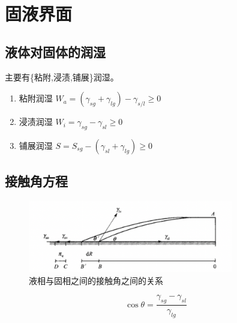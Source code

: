 \chapter{固液界面}

\section{液体对固体的润湿}

主要有\{粘附,浸渍,铺展\}润湿。

\begin{enumerate}
    \item 粘附润湿 $W_a = \left(\gamma_{sg} + \gamma_{lg}\right) - \gamma_{s/l} \geq 0$
    \item 浸渍润湿 $W_i = \gamma_{sg} - \gamma_{sl} \geq 0$
    \item 铺展润湿 $S = S_{sg} - \left(\gamma_{sl} + \gamma_{lg}\right) \geq 0$
\end{enumerate}

\section{接触角方程}

\begin{figure}[h]
    \centering
    \includegraphics[width=0.8\textwidth]{images/sl_surface.png}
    \caption{液相与固相之间的接触角之间的关系}
\end{figure}

\begin{equation}
    \cos \theta = \frac{\gamma_{sg} - \gamma_{sl}}{\gamma_{lg}}
\end{equation}
